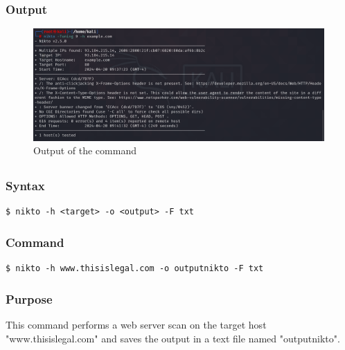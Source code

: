 \documentclass[11pt]{article}
\begin{document}
\subsubsection*{Output}
\begin{figure}[H]
    \centering
    \includegraphics[width=0.99\textwidth]{assignment 8 (6).png}
    \caption{Output of the command}
\end{figure}

\subsection{}

\subsubsection*{Syntax}
\begin{verbatim}
$ nikto -h <target> -o <output> -F txt
\end{verbatim}

\subsubsection*{Command}
\begin{verbatim}
$ nikto -h www.thisislegal.com -o outputnikto -F txt
\end{verbatim}

\subsubsection*{Purpose}
This command performs a web server scan on the target host "www.thisislegal.com" and saves the output in a text file named "outputnikto".
\end{document}
